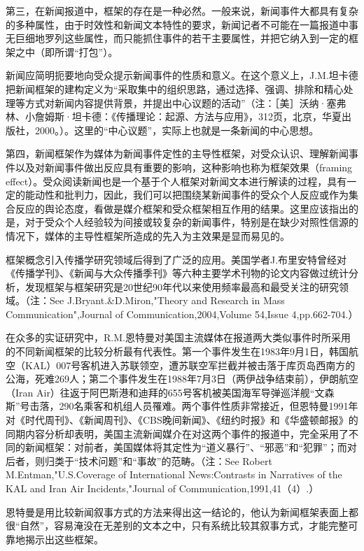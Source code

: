 \documentclass[UTF8,12pt]{ctexart}
\numberwithin{equation}{section} %
\numberwithin{figure}{section}
\numberwithin{table}{section}
\begin{document}
	第三，在新闻报道中，框架的存在是一种必然。一般来说，新闻事件大都具有复杂的多种属性，由于时效性和新闻文本特性的要求，新闻记者不可能在一篇报道中事无巨细地罗列这些属性，而只能抓住事件的若干主要属性，并把它纳入到一定的框架之中（即所谓“打包”）。
	
	新闻应简明扼要地向受众提示新闻事件的性质和意义。在这个意义上，J.M.坦卡德把新闻框架的建构定义为“采取集中的组织思路，通过选择、强调、排除和精心处理等方式对新闻内容提供背景，并提出中心议题的活动”（注：［美］沃纳·塞弗林、小詹姆斯·坦卡德：《传播理论：起源、方法与应用》，312页，北京，华夏出版社，2000。）。这里的“中心议题”，实际上也就是一条新闻的中心思想。
	
	第四，新闻框架作为媒体为新闻事件定性的主导性框架，对受众认识、理解新闻事件以及对新闻事件做出反应具有重要的影响，这种影响也称为框架效果（framing effect）。受众阅读新闻也是一个基于个人框架对新闻文本进行解读的过程，具有一定的能动性和批判力，因此，我们可以把围绕某新闻事件的受众个人反应或作为集合反应的舆论态度，看做是媒介框架和受众框架相互作用的结果。这里应该指出的是，对于受众个人经验较为间接或较复杂的新闻事件，特别是在缺少对照性信源的情况下，媒体的主导性框架所造成的先入为主效果是显而易见的。
	
	框架概念引入传播学研究领域后得到了广泛的应用。美国学者J.布里安特曾经对《传播学刊》、《新闻与大众传播季刊》等六种主要学术刊物的论文内容做过统计分析，发现框架与框架研究是20世纪90年代以来使用频率最高和最受关注的研究领域。（注：See J.Bryant.\&D.Miron,"Theory and Research in Mass Communication",Journal of Communication,2004,Volume 54,Issue 4,pp.662-704.）
	
	在众多的实证研究中，R.M.恩特曼对美国主流媒体在报道两大类似事件时所采用的不同新闻框架的比较分析最有代表性。第一个事件发生在1983年9月1日，韩国航空（KAL）007号客机进入苏联领空，遭苏联空军拦截并被击落于库页岛西南方的公海，死难269人；第二个事件发生在1988年7月3日（两伊战争结束前），伊朗航空（Iran Air）往返于阿巴斯港和迪拜的655号客机被美国海军导弹巡洋舰“文森斯”号击落，290名乘客和机组人员罹难。两个事件性质非常接近，但恩特曼1991年对《时代周刊》、《新闻周刊》、《CBS晚间新闻》、《纽约时报》和《华盛顿邮报》的同期内容分析却表明，美国主流新闻媒介在对这两个事件的报道中，完全采用了不同的新闻框架：对前者，美国媒体将其定性为“道义暴行”、“邪恶”和“犯罪”；而对后者，则归类于“技术问题”和“事故”的范畴。（注：See Robert M.Entman,"U.S.Coverage of International News:Contrasts in Narratives of the KAL and Iran Air Incidents,"Journal of Communication,1991,41（4）.）
	
	恩特曼是用比较新闻叙事方式的方法来得出这一结论的，他认为新闻框架表面上都很“自然”，容易淹没在无差别的文本之中，只有系统比较其叙事方式，才能完整可靠地揭示出这些框架。
	
\end{document}
